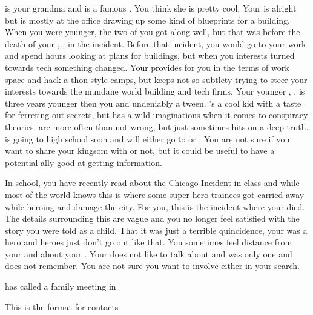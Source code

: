 \documentclass[char]{LRSguildcamp1}
\begin{document}
\cGrandma{} is your grandma and is a famous \cGrandma{\villain}. You think she is pretty cool. Your \cArchitect{\parent} is alright but is mostly at the office drawing up some kind of blueprints for a building. When you were younger, the two of you got along well, but that was before the death of your \cAS{\parent}, \cAS{}, in the \pCityO{} incident. Before that incident, you would go to your \cArchitect{\parent} work and spend hours looking at plans for buildings, but when you interests turned towards tech something changed. Your \cArchitect{\parent} provides for you in the terms of work space and hack-a-thon style camps, but keeps not so subtlety trying to steer your interests towards the mundane world building and tech firms. Your younger \cTween{\sibling}, \cTween{}, is three years younger then you and undeniably a tween. \cTween{}'s a cool kid with a taste for ferreting out secrets, but has a wild imaginations when it comes to conspiracy theories. \cTween{\they} are more often than not wrong, but just sometimes hits on a deep truth. \cTween{} is going to high school soon and will either go to \pNormalSchool{} or \pSuperSchool{}. You are not sure if you want to share your kingsom with \cTween{\him} or not, but it could be useful to have a potential ally good at getting information. 

In school, you have recently read about the Chicago Incident in class and while most of the world knows this is where some super hero trainees got carried away while heroing and damage the city. For you, this is the incident where your \cAS{\parent} died. The details surrounding this are vague and you no longer feel satisfied with the story you were told as a child. That it was just a terrible quincidence, your \AS{} was a hero and heroes just don't go out like that. You sometimes feel distance from your\cArchitect{\parent} and \cTween{} about your \cAS{\parent}. Your \cArchitect{\parent} does not like to talk about \cAS{} and \cTween{} was only one and does not remember. You are not sure you want to involve either in your search.

\cGrandma{} has called a family meeting in \pCityGrandma{}

 
\begin{itemz}[Goals]
	\item 
\end{itemz}

\begin{itemz}[Notes]
	\item 
\end{itemz}

\begin{contacts}
	\contact{}  This is the format for contacts 
\end{contacts}
\end{document}
